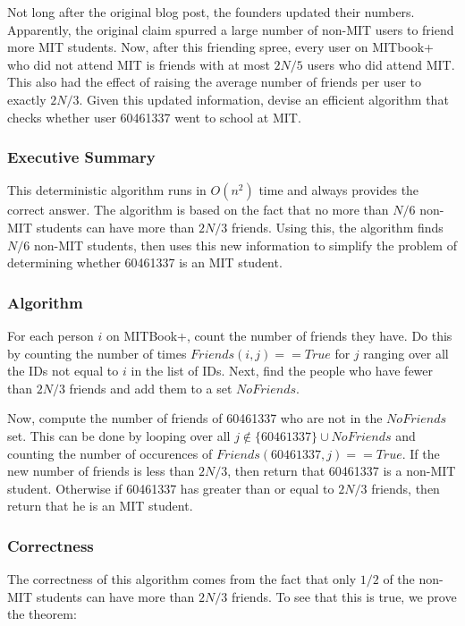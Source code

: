 \documentclass{6046}
\begin{document}
{\em

Not long after the original blog post, the founders updated their numbers.
Apparently, the original claim spurred a large number of non-MIT users to
friend more MIT students.  Now, after this friending spree, every user on
MITbook+ who did not attend MIT is friends with at most $2N / 5$ users who did
attend MIT.  This also had the effect of raising the average number of friends
per user to exactly $2N / 3$.  Given this updated information, devise an
efficient algorithm that checks whether user 60461337 went to school at MIT.

}

\subsubsection*{Executive Summary}

This deterministic algorithm runs in $O(n^2)$ time and always provides the correct answer. The algorithm is based on the fact that no more than $N/6$ non-MIT students can have more than $2N/3$ friends. Using this, the algorithm finds $N/6$ non-MIT students, then uses this new information to simplify the problem of determining whether 60461337 is an MIT student. 

\subsubsection*{Algorithm}

For each person $i$ on MITBook+, count the number of friends they have. Do this by counting the number of times $Friends(i, j) == True$ for $j$ ranging over all the IDs not equal to $i$ in the list of IDs. Next, find the people who have fewer than $2N/3$ friends and add them to a set $NoFriends$. 

Now, compute the number of friends of 60461337 who are not in the $NoFriends$ set. This can be done by looping over all $j \notin \{60461337\} \cup NoFriends $ and counting the number of occurences of $Friends(60461337,j) == True$. If the new number of friends is less than $2N/3$, then return that 60461337 is a non-MIT student. Otherwise if 60461337 has greater than or equal to $2N/3$ friends, then return that he is an MIT student.

\subsubsection*{Correctness}

The correctness of this algorithm comes from the fact that only $1/2$ of the non-MIT students can have more than $2N/3$ friends. To see that this is true, we prove the theorem:
\end{document}
